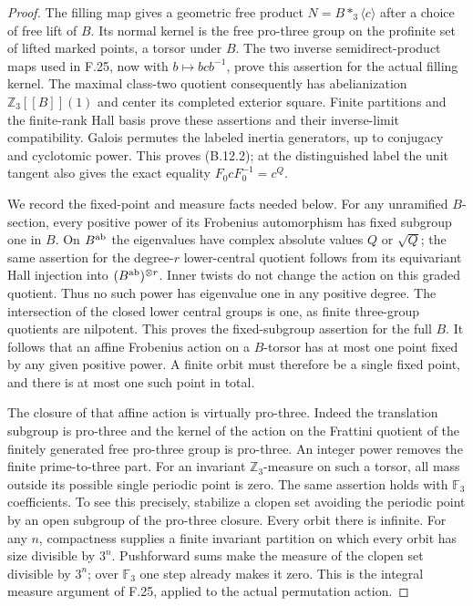 \begin{proof}
The filling map gives a geometric free product
$N=B*_3\langle c\rangle$ after a choice of free lift
of $B$. Its normal kernel is the free pro-three group on
the profinite set of lifted marked points, a torsor under
$B$. The two inverse semidirect-product maps used in
F.25, now with $b\mapsto bcb^{-1}$, prove this assertion
for the actual filling kernel. The maximal class-two
quotient consequently has abelianization
$\mathbb Z_3[[B]](1)$ and center its completed exterior
square. Finite partitions and the finite-rank Hall basis
prove these assertions and their inverse-limit
compatibility. Galois permutes the labeled inertia
generators, up to conjugacy and cyclotomic power.
This proves (B.12.2); at the distinguished label the
unit tangent also gives the exact equality
$F_0cF_0^{-1}=c^Q$.

We record the fixed-point and measure facts needed below.
For any unramified $B$-section, every positive power of
its Frobenius automorphism has fixed subgroup one in $B$.
On $B^{\rm ab}$ the eigenvalues have complex absolute
values $Q$ or $\sqrt Q$; the same assertion for the
degree-$r$ lower-central quotient follows from its
equivariant Hall injection into $(B^{\rm ab})^{\otimes r}$.
Inner twists do not change the action on this graded
quotient. Thus no such power has eigenvalue one in any
positive degree. The intersection of the closed lower
central groups is one, as finite three-group quotients
are nilpotent. This proves the fixed-subgroup assertion
for the full $B$.
It follows that an affine Frobenius action on a $B$-torsor
has at most one point fixed by any given positive power.
A finite orbit must therefore be a single fixed point,
and there is at most one such point in total.

The closure of that affine action is virtually pro-three.
Indeed the translation subgroup is pro-three and the
kernel of the action on the Frattini quotient of the
finitely generated free pro-three group is pro-three.
An integer power removes the finite prime-to-three part.
For an invariant $\mathbb Z_3$-measure on such a torsor,
all mass outside its possible single periodic point is
zero. The same assertion holds with $\mathbb F_3$
coefficients. To see this precisely, stabilize a clopen
set avoiding the periodic point by an open subgroup
of the pro-three closure. Every orbit there is infinite.
For any $n$, compactness supplies a finite invariant
partition on which every orbit has size divisible by
$3^n$. Pushforward sums make the measure of the
clopen set divisible by $3^n$; over $\mathbb F_3$
one step already makes it zero.
This is the integral measure argument of F.25, applied
to the actual permutation action.


\end{proof}
